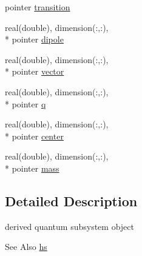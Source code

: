 \begin{DoxyCompactItemize}
pointer \hyperlink{structdipoles__class_1_1dipoles_a89dfcd300426c525f92d7ca048dfbfdb}{transition}
\item 
real(double), dimension(\-:,\-:), \\*
pointer \hyperlink{structdipoles__class_1_1dipoles_a6786ac3377ec10046d5a7bacf0b14da1}{dipole}
\item 
real(double), dimension(\-:,\-:), \\*
pointer \hyperlink{structdipoles__class_1_1dipoles_a658a483ea027a653fefdd02718773ea6}{vector}
\item 
real(double), dimension(\-:,\-:), \\*
pointer \hyperlink{structdipoles__class_1_1dipoles_ab97f9dcc84c8fafe029986f103d99630}{q}
\item 
real(double), dimension(\-:,\-:), \\*
pointer \hyperlink{structdipoles__class_1_1dipoles_ab7c31b6af230c4668d6fd24b359836bf}{center}
\item 
real(double), dimension(\-:,\-:), \\*
pointer \hyperlink{structdipoles__class_1_1dipoles_af9a15beeff0e1c4f47e28fc136fd9ea8}{mass}
\end{DoxyCompactItemize}


\subsection{Detailed Description}
derived quantum subsystem object 

\begin{DoxySeeAlso}{See Also}
\hyperlink{structdipoles__class_1_1dipoles_afa2264f1ca48581328e2ab0e1745db4a}{hs} 
\end{DoxySeeAlso}



